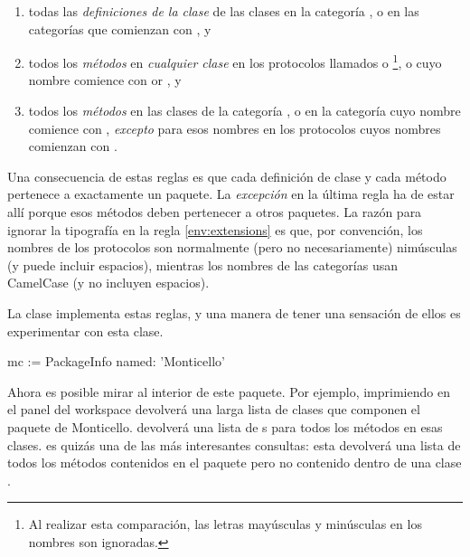 \documentclass[spanish,a4paper,10pt,twoside]{book}
\begin{document}
\begin{enumerate}		
	\item{} todas las \emph{definiciones de la clase} de las clases en la categor\'ia , o en las categor\'ias que comienzan con , y
	\item{} \label{env:extensions} todos los \emph{m\'etodos} en \emph{cualquier clase} en los protocolos llamados  o \footnote{Al realizar esta comparaci\'on, las letras may\'usculas y min\'usculas  en los nombres son ignoradas.}, o cuyo nombre comience con  or , y
	\item{} todos los \emph{m\'etodos} en las clases de la categor\'ia , o en la categor\'ia cuyo nombre comience con , \emph{excepto} para esos nombres en los protocolos cuyos nombres comienzan con \prot{*}.
	
\end{enumerate}
\noindent
Una consecuencia de estas reglas es que cada definici\'on de clase y cada m\'etodo pertenece a exactamente un paquete. La \emph{excepci\'on} en la \'ultima regla ha de estar all\'i porque esos m\'etodos deben pertenecer a otros paquetes. La raz\'on para ignorar la tipograf\'ia en la regla \ref{env:extensions} es que, por convenci\'on, los nombres de los protocolos son normalmente (pero no necesariamente) nim\'usculas (y puede incluir espacios), mientras los nombres de las categor\'ias usan CamelCase (y no incluyen espacios).

La clase  implementa estas reglas, y una manera de tener una sensaci\'on de ellos es experimentar con esta clase.


\begin{code}{}
mc := PackageInfo named: 'Monticello'
\end{code}

Ahora es posible mirar al interior de este paquete.
Por ejemplo, imprimiendo  en el panel del workspace devolver\'a una larga lista de clases que componen el paquete de Monticello.
devolver\'a una lista de s para todos los m\'etodos en esas clases.  es quiz\'as una de las m\'as interesantes consultas: esta devolver\'a una lista de todos los m\'etodos contenidos en el paquete  pero no contenido dentro de una clase .
\end{document}
